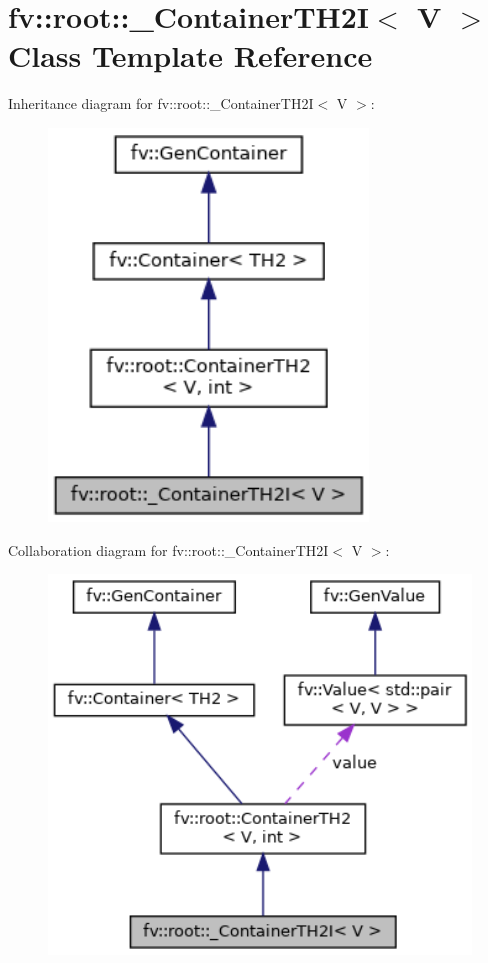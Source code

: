 \hypertarget{classfv_1_1root_1_1__ContainerTH2I}{}\section{fv\+:\+:root\+:\+:\+\_\+\+Container\+T\+H2I$<$ V $>$ Class Template Reference}
\label{classfv_1_1root_1_1__ContainerTH2I}


Inheritance diagram for fv\+:\+:root\+:\+:\+\_\+\+Container\+T\+H2I$<$ V $>$\+:
\nopagebreak
\begin{figure}[H]
\begin{center}
\leavevmode
\includegraphics[width=241pt]{classfv_1_1root_1_1__ContainerTH2I__inherit__graph}
\end{center}
\end{figure}


Collaboration diagram for fv\+:\+:root\+:\+:\+\_\+\+Container\+T\+H2I$<$ V $>$\+:
\nopagebreak
\begin{figure}[H]
\begin{center}
\leavevmode
\includegraphics[width=330pt]{classfv_1_1root_1_1__ContainerTH2I__coll__graph}
\end{center}
\end{figure}
